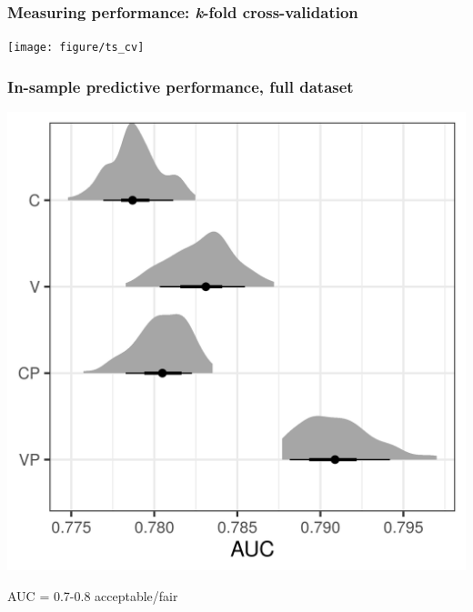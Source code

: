 \documentclass{beamer}
\begin{document}
\begin{frame}
  \frametitle{Measuring performance: \textit{k}-fold cross-validation}

  \begin{center}
    \texttt{[image: figure/ts\_cv]}
  \end{center}


\end{frame}

%
%
%

\begin{frame}
  \frametitle{In-sample predictive performance, full dataset}

  \begin{center}
    \includegraphics[width=\textwidth,height=0.8\textheight,keepaspectratio=true]{../results/figure/auc_hist_full}

    \footnotesize{AUC = 0.7-0.8 acceptable/fair}
  \end{center}

\end{frame}
\end{document}
